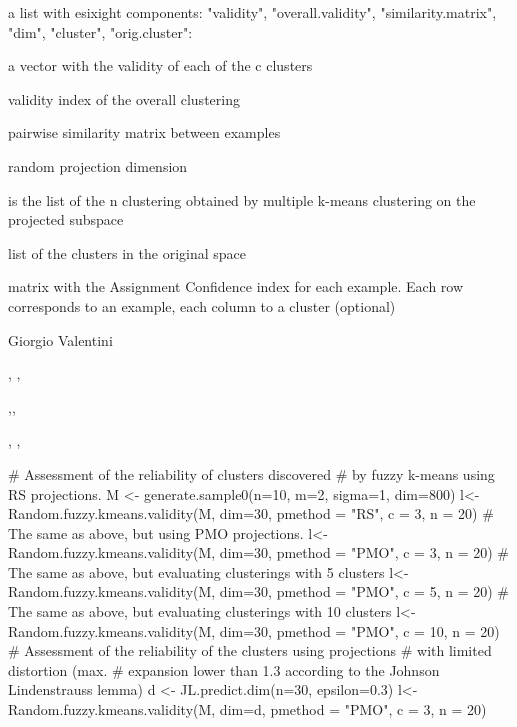 \documentclass{article}
\begin{document}
\begin{Value}
a list with esixight components: "validity", "overall.validity", "similarity.matrix", "dim", 
"cluster",  "orig.cluster":
\begin{ldescription}
\item[\code{validity }] a vector with the validity of each of the c clusters
\item[\code{overall.validity }] validity index of the overall clustering
\item[\code{similarity.matrix }] pairwise similarity matrix between examples
\item[\code{dimension }] random projection dimension
\item[\code{cluster }] is the list of the n clustering obtained by multiple k-means clustering on the projected subspace
\item[\code{orig.cluster }] list of the clusters in the original space
\item[\code{AC }] matrix with the Assignment Confidence index for each example. Each row corresponds to an example, 
each column to a cluster (optional)
\end{ldescription}
\end{Value}
\begin{Author}\relax
Giorgio Valentini 
\end{Author}
\begin{SeeAlso}\relax
{}, , 

,,

, , 
\end{SeeAlso}
\begin{Examples}
\begin{ExampleCode}
# Assessment of the reliability of clusters discovered 
# by fuzzy k-means using RS projections. 
M <- generate.sample0(n=10, m=2, sigma=1, dim=800)
l<-Random.fuzzy.kmeans.validity(M, dim=30, pmethod = "RS", c = 3,  n = 20)
# The same as above, but using PMO projections. 
l<-Random.fuzzy.kmeans.validity(M, dim=30, pmethod = "PMO", c = 3, n = 20)
# The same as above, but evaluating clusterings with 5 clusters 
l<-Random.fuzzy.kmeans.validity(M, dim=30, pmethod = "PMO", c = 5, n = 20)
# The same as above, but evaluating clusterings with 10 clusters 
l<-Random.fuzzy.kmeans.validity(M, dim=30, pmethod = "PMO", c = 10, n = 20)
# Assessment of the reliability of the clusters using projections 
# with limited distortion (max. 
# expansion lower than 1.3 according to the Johnson Lindenstrauss lemma)
d <- JL.predict.dim(n=30, epsilon=0.3)
l<-Random.fuzzy.kmeans.validity(M, dim=d, pmethod = "PMO", c = 3, n = 20)

\end{ExampleCode}
\end{Examples}
\end{document}
